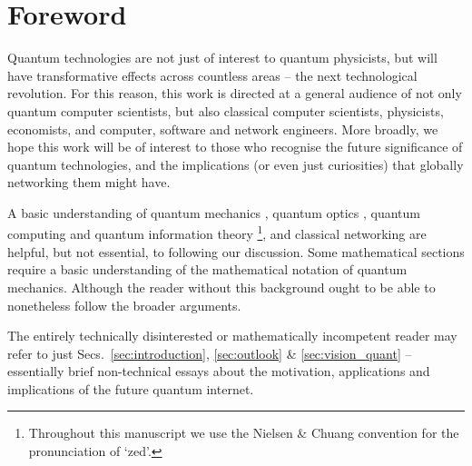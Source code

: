 \documentclass[aps, rmp, twocolumn, amsmath, amssymb, nofootinbib, superscriptaddress, longbibliography, floatfix, table-of-contents, eqsecnum]{revtex4-1}
\begin{document}
%
%

\maketitle

%
%

\makeatletter
\def\l@paragraph{\@dottedtocline{4}{8em}{1.2em}}
\makeatother

\makeatletter
{}
\makeatother

\tableofcontents 
{}

%
%

\section{Foreword}

Quantum technologies are not just of interest to quantum physicists, but will have transformative effects across countless areas -- the next technological revolution. For this reason, this work is directed at a general audience of not only quantum computer scientists, but also classical computer scientists, physicists, economists, and computer, software and network engineers. More broadly, we hope this work will be of interest to those who recognise the future significance of quantum technologies, and the implications (or even just curiosities) that globally networking them might have.

A basic understanding of quantum mechanics \cite{bib:Sakurai94}, quantum optics \cite{bib:GerryKnight05}, quantum computing and quantum information theory \cite{bib:NielsenChuang00}\footnote{Throughout this manuscript we use the Nielsen \& Chuang convention for the pronunciation of `zed'.}, and classical networking \cite{bib:TanenbaumNet} are helpful, but not essential, to following our discussion. Some mathematical sections require a basic understanding of the mathematical notation of quantum mechanics. Although the reader without this background ought to be able to nonetheless follow the broader arguments.

The entirely technically disinterested or mathematically incompetent reader may refer to just Secs.~\ref{sec:introduction}, \ref{sec:outlook} \& \ref{sec:vision_quant} -- essentially brief non-technical essays about the motivation, applications and implications of the future quantum internet.
\end{document}

